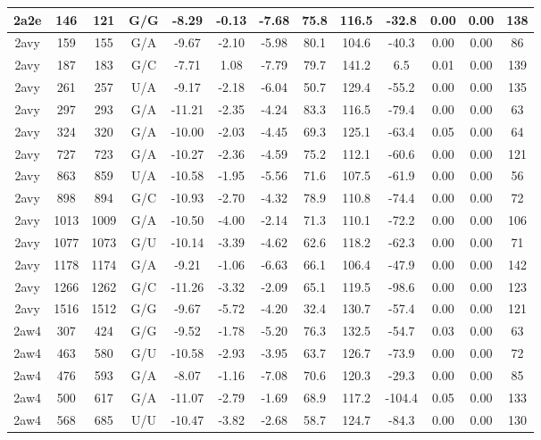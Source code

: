 {\begin{center}
\begin{longtable}{|c|c|c|c|c|c|c|c|c|c|c|c|c|}
2a2e & 146 & 121 & G/G & -8.29 & -0.13 & -7.68 & 75.8 & 116.5 & -32.8 & 0.00 & 0.00 & 138 \\ \hline
2avy & 159 & 155 & G/A & -9.67 & -2.10 & -5.98 & 80.1 & 104.6 & -40.3 & 0.00 & 0.00 & 86 \\ \hline
2avy & 187 & 183 & G/C & -7.71 & 1.08 & -7.79 & 79.7 & 141.2 & 6.5 & 0.01 & 0.00 & 139 \\ \hline
2avy & 261 & 257 & U/A & -9.17 & -2.18 & -6.04 & 50.7 & 129.4 & -55.2 & 0.00 & 0.00 & 135 \\ \hline
2avy & 297 & 293 & G/A & -11.21 & -2.35 & -4.24 & 83.3 & 116.5 & -79.4 & 0.00 & 0.00 & 63 \\ \hline
2avy & 324 & 320 & G/A & -10.00 & -2.03 & -4.45 & 69.3 & 125.1 & -63.4 & 0.05 & 0.00 & 64 \\ \hline
2avy & 727 & 723 & G/A & -10.27 & -2.36 & -4.59 & 75.2 & 112.1 & -60.6 & 0.00 & 0.00 & 121 \\ \hline
2avy & 863 & 859 & U/A & -10.58 & -1.95 & -5.56 & 71.6 & 107.5 & -61.9 & 0.00 & 0.00 & 56 \\ \hline
2avy & 898 & 894 & G/C & -10.93 & -2.70 & -4.32 & 78.9 & 110.8 & -74.4 & 0.00 & 0.00 & 72 \\ \hline
2avy & 1013 & 1009 & G/A & -10.50 & -4.00 & -2.14 & 71.3 & 110.1 & -72.2 & 0.00 & 0.00 & 106 \\ \hline
2avy & 1077 & 1073 & G/U & -10.14 & -3.39 & -4.62 & 62.6 & 118.2 & -62.3 & 0.00 & 0.00 & 71 \\ \hline
2avy & 1178 & 1174 & G/A & -9.21 & -1.06 & -6.63 & 66.1 & 106.4 & -47.9 & 0.00 & 0.00 & 142 \\ \hline
2avy & 1266 & 1262 & G/C & -11.26 & -3.32 & -2.09 & 65.1 & 119.5 & -98.6 & 0.00 & 0.00 & 123 \\ \hline
2avy & 1516 & 1512 & G/G & -9.67 & -5.72 & -4.20 & 32.4 & 130.7 & -57.4 & 0.00 & 0.00 & 121 \\ \hline
2aw4 & 307 & 424 & G/G & -9.52 & -1.78 & -5.20 & 76.3 & 132.5 & -54.7 & 0.03 & 0.00 & 63 \\ \hline
2aw4 & 463 & 580 & G/U & -10.58 & -2.93 & -3.95 & 63.7 & 126.7 & -73.9 & 0.00 & 0.00 & 72 \\ \hline
2aw4 & 476 & 593 & G/A & -8.07 & -1.16 & -7.08 & 70.6 & 120.3 & -29.3 & 0.00 & 0.00 & 85 \\ \hline
2aw4 & 500 & 617 & G/A & -11.07 & -2.79 & -1.69 & 68.9 & 117.2 & -104.4 & 0.05 & 0.00 & 133 \\ \hline
2aw4 & 568 & 685 & U/U & -10.47 & -3.82 & -2.68 & 58.7 & 124.7 & -84.3 & 0.00 & 0.00 & 130 \\ \hline

\end{longtable}
\end{center}}

